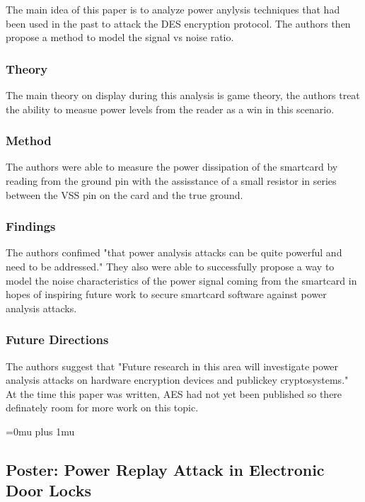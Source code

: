 \noindent
The main idea of this paper is to analyze power anylysis techniques that had been used in the past to attack the DES encryption protocol. The authors then propose a method to model the signal vs noise ratio.

\subsubsection{Theory}

\noindent
The main theory on display during this analysis is game theory, the authors treat the ability to measue power levels from the reader as a win in this scenario.

\subsubsection{Method}

\noindent
The authors were able to measure the power dissipation of the smartcard by reading from the ground pin with the assisstance of a small resistor in series between the VSS pin on the card and the true ground.

\subsubsection{Findings}

\noindent
The authors confimed "that power analysis attacks can be quite powerful and need to be addressed." They also were able to successfully propose a way to model the noise characteristics of the power signal coming from the smartcard in hopes of inspiring future work to secure smartcard software against power analysis attacks.

\subsubsection{Future Directions}

\noindent
The authors suggest that "Future research in this area will investigate power analysis attacks on hardware encryption devices and publickey cryptosystems." At the time this paper was written, AES had not yet been published so there definately room for more work on this topic.  

\Urlmuskip=0mu plus 1mu\relax

\noindent
\subsection{Poster: Power Replay Attack in Electronic Door Locks}

